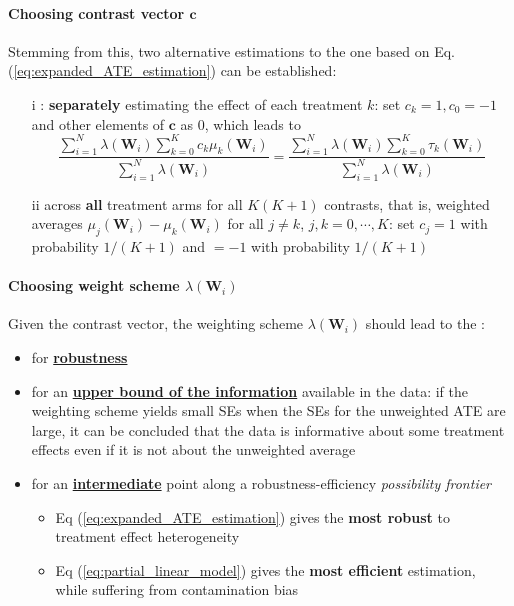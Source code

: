 \documentclass[twoside]{article}
\begin{document}
\paragraph*{Choosing contrast vector $\mathbf{c}$} Stemming from this, two alternative estimations to the one based on Eq. (\ref{eq:expanded_ATE_estimation}) can be established:

\begin{itemize}
    \item[i] : \textbf{separately} estimating the effect of each treatment $k$: set $c_k=1, c_0=-1$ and other elements of $\mathbf{c}$ as 0, which leads to
    $$
    \frac{\sum^N_{i=1}\lambda(\mathbf{W}_i)\sum^K_{k=0} c_k\mu_k(\mathbf{W}_i)}{\sum^N_{i=1}\lambda(\mathbf{W}_i)} = \frac{\sum^N_{i=1}\lambda(\mathbf{W}_i)\sum^K_{k=0} \tau_k(\mathbf{W}_i)}{\sum^N_{i=1}\lambda(\mathbf{W}_i)}
    $$
    \item[ii]  across \textbf{all} treatment arms for all $K(K+1)$ contrasts, that is, weighted averages $\mu_j(\mathbf{W}_i) - \mu_k(\mathbf{W}_i)$ for all $j\neq k$, $j,k=0,\cdots,K$: set $c_j=1$ with probability $1/(K+1)$ and $=-1$ with probability $1/(K+1)$
\end{itemize}

\paragraph*{Choosing weight scheme $\lambda(\mathbf{W}_i)$} Given the contrast vector, the weighting scheme $\lambda(\mathbf{W}_i)$ should lead to the :
\begin{itemize}
    \item for \textbf{\underline{robustness}}
    \item for an \textbf{\underline{upper bound of the information}} available in the data: if the weighting scheme yields small SEs when the SEs for the unweighted ATE are large, it can be concluded that the data is informative about some treatment effects even if it is not about the unweighted average
    \item for an \textbf{\underline{intermediate}} point along a robustness-efficiency \textit{possibility frontier}
    \begin{itemize}
        \item Eq (\ref{eq:expanded_ATE_estimation}) gives the \textbf{most robust} to treatment effect heterogeneity
        \item Eq (\ref{eq:partial_linear_model}) gives the \textbf{most efficient} estimation, while suffering from contamination bias
    \end{itemize}
\end{itemize}
\end{document}

